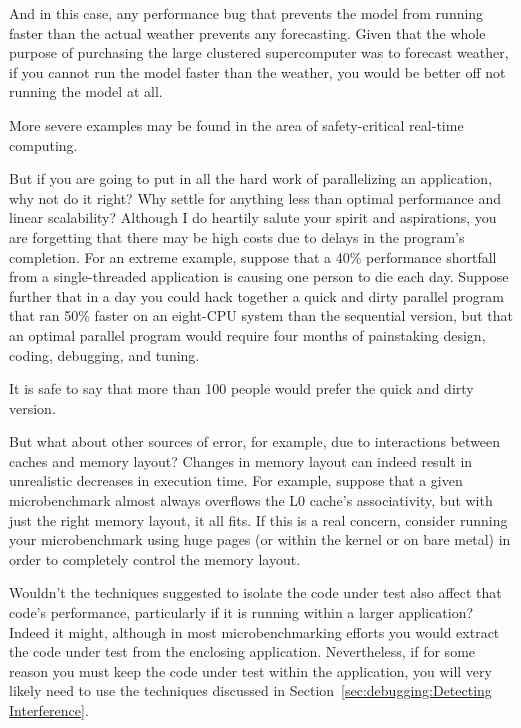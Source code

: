 	And in this case, any performance bug that prevents the model from
	running faster than the actual weather prevents any forecasting.
	Given that the whole purpose of purchasing the large clustered
	supercomputer was to forecast weather, if you cannot run the
	model faster than the weather, you would be better off not running
	the model at all.

	More severe examples may be found in the area of safety-critical
	real-time computing.

\QuickQ{}
	But if you are going to put in all the hard work of parallelizing
	an application, why not do it right?
	Why settle for anything less than optimal performance and
	linear scalability?
\QuickA{}
	Although I do heartily salute your spirit and aspirations,
	you are forgetting that there may be high costs due to delays
	in the program's completion.
	For an extreme example, suppose that a 40\% performance shortfall
	from a single-threaded application is causing one person to die
	each day.
	Suppose further that in a day you could hack together a
	quick and dirty
	parallel program that ran 50\% faster on an eight-CPU system
	than the sequential version, but that an optimal parallel
	program would require four months of painstaking design, coding,
	debugging, and tuning.

	It is safe to say that more than 100 people would prefer the
	quick and dirty version.

\QuickQ{}
	But what about other sources of error, for example, due to
	interactions between caches and memory layout?
\QuickA{}
	Changes in memory layout can indeed result in unrealistic
	decreases in execution time.
	For example, suppose that a given microbenchmark almost
	always overflows the L0 cache's associativity, but with just the right
	memory layout, it all fits.
	If this is a real concern, consider running your microbenchmark
	using huge pages (or within the kernel or on bare metal) in
	order to completely control the memory layout.

\QuickQ{}
	Wouldn't the techniques suggested to isolate the code under
	test also affect that code's performance, particularly if
	it is running within a larger application?
\QuickA{}
	Indeed it might, although in most microbenchmarking efforts
	you would extract the code under test from the enclosing
	application.
	Nevertheless, if for some reason you must keep the code under
	test within the application, you will very likely need to use
	the techniques discussed in
	Section~\ref{sec:debugging:Detecting Interference}.


